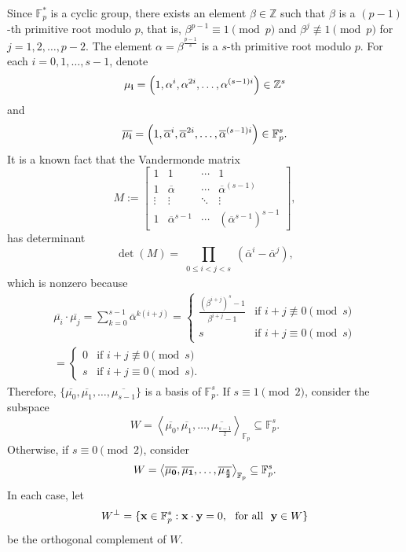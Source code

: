 \documentclass{amsart}
\begin{document}
Since $\mathbb{F}_p^*$ is a cyclic group, there exists an element $\beta\in\mathbb{Z}$ such that $\beta$ is a $(p-1)$-th primitive root modulo $p$, that is, $\beta^{p-1}\equiv 1\pmod p$ and $\beta^j\not\equiv 1\pmod p$ for $j=1,2,\ldots,p-2$. The element $\alpha=\beta^{\frac{p-1}{s}}$ is a $s$-th primitive root modulo $p$. For each $i=0,1,\ldots,s-1$, denote \begin{equation} \label{eq-0} {\bf \mu_i}= \left(1,\alpha^i,\alpha^{2i},\ldots,\alpha^{(s-1)i}\right) \in \mathbb{Z}^s \end{equation} and \[ \overline{{\bf \mu_i}} = \left(1,\overline{\alpha}^i,\overline{\alpha}^{2i},\ldots,\overline{\alpha}^{(s-1)i}\right) \in \mathbb{F}_p^s. \] It is a known fact that the Vandermonde matrix \[ M := \left[ \begin{array}{cccc} 1 & 1 & \cdots & 1\\ 1 & \overline{\alpha} & \cdots & \overline{\alpha}^{(s-1)} \\ \vdots & \vdots & \ddots & \vdots \\ 1 & \overline{\alpha}^{s-1} & \cdots & (\overline{\alpha}^{s-1})^{s-1} \end{array} \right], \] has determinant
\[ \det(M) = \prod_{\substack{0\leq i<j<s}}(\overline{\alpha}^i-\overline{\alpha}^j), \] which is nonzero because
\begin{multline}\label{eq-1} \overline{\mu_i}\cdot\overline{\mu_j}  = \sum_{k=0}^{s-1} \overline{\alpha}^{k(i+j)} = \begin{cases} \frac{(\beta^{i+j})^s-1}{\beta^{i+j}-1} & \mbox{if } i+j\not\equiv 0\pmod s\\ s & \mbox{if } i+j\equiv 0\pmod s    \end{cases}\\ =  \begin{cases}
0 & \mbox{if } i+j\not\equiv 0\pmod s\\ s & \mbox{if } i+j\equiv 0\pmod s.\end{cases} \end{multline} Therefore, $\{\overline{\mu_0},\overline{\mu_1},\ldots,\overline{\mu_{s-1}}\}$ is a basis of $\mathbb{F}_p^s$.
If $s\equiv 1\pmod 2$, consider the subspace \[ W = \left\langle\overline{\mu_0},\overline{\mu_1},\ldots,\overline{\mu_{\frac{s-1}{2}}}\right\rangle_{\mathbb{F}_p} \subseteq\mathbb{F}_p^s. \]
Otherwise, if $s\equiv 0\pmod 2$, consider
\[  W=\left\langle\overline{\bf \mu_0},\overline{\bf \mu_1},\ldots,\overline{\bf \mu_{\frac{s}{2}}}\right\rangle_{\mathbb{F}_p} \subseteq\mathbb{F}_p^s. \] In each case, let \[ W^{\perp} = \{ {\bf x} \in \mathbb{F}_p^s:{\bf x}\cdot{\bf y}=0, \ \ \mbox{for all} \ \ {\bf y}\in W\} \] be the orthogonal complement of $W$.
\end{document}

